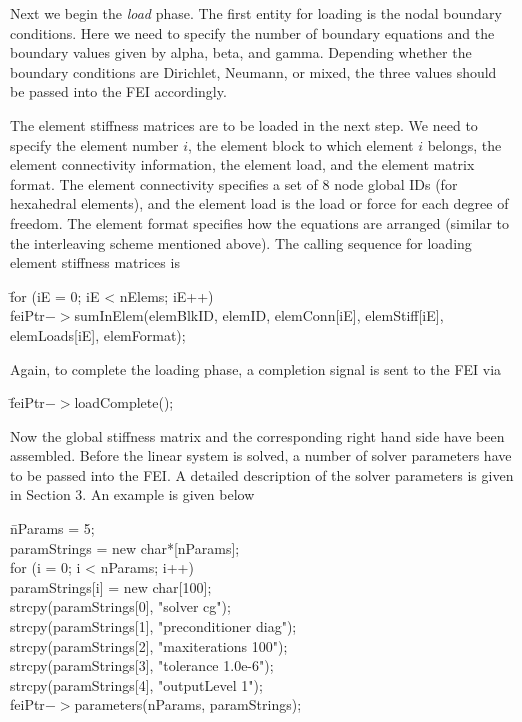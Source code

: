Next we begin the {\it load} phase. The first entity for loading is the
nodal boundary conditions. Here we need to specify the number of boundary
equations and the boundary values given by {\sf alpha, beta}, and {\sf gamma}.  Depending whether the boundary conditions are Dirichlet, Neumann, or mixed,
the three values should be passed into the {\sf FEI} accordingly. 

The element stiffness matrices are to be loaded in the next step. We need
to specify the element number $i$, the element block to which element $i$
belongs, the element connectivity information, the element load, and the
element matrix format. The element connectivity specifies a set of $8$ node
global IDs (for hexahedral elements), and the element load is the load or
force for each degree of freedom.  The element format specifies how the
equations are arranged (similar to the interleaving scheme mentioned above).
The calling sequence for loading element stiffness matrices is
\begin{tabbing}
\hspace{0.5in} \= {\sf for (iE = 0; iE < nElems; iE++)} \\
 \> \hspace{0.5in} {\sf feiPtr$->$sumInElem(elemBlkID, elemID, elemConn[iE], elemStiff[iE],} \\
 \> \hspace{1.5in} {\sf elemLoads[iE], elemFormat);}
\end{tabbing}
Again, to complete the loading phase, a completion signal is sent to 
the {\sf FEI} via
\begin{tabbing}
\hspace{0.5in} \= {\sf feiPtr$->$loadComplete();}
\end{tabbing}
 
Now the global stiffness matrix and the corresponding right hand side
have been assembled. Before the linear system is solved, a number of 
solver parameters have to be passed into the {\sf FEI}. A detailed description
of the solver parameters is given in Section 3. An example is given below
\begin{tabbing}
\hspace{0.5in} \= {\sf nParams = 5;} \\
               \> {\sf paramStrings = new char*[nParams];} \\
               \> {\sf for (i = 0; i < nParams; i++) }\\
               \> \hspace{0.5in} {\sf paramStrings[i] = new char[100];} \\
               \> {\sf strcpy(paramStrings[0], "solver cg");} \\
               \> {\sf strcpy(paramStrings[1], "preconditioner diag");} \\
               \> {\sf strcpy(paramStrings[2], "maxiterations 100");} \\
               \> {\sf strcpy(paramStrings[3], "tolerance 1.0e-6");} \\
               \> {\sf strcpy(paramStrings[4], "outputLevel 1");} \\
               \> {\sf feiPtr$->$parameters(nParams, paramStrings);} 
\end{tabbing}

